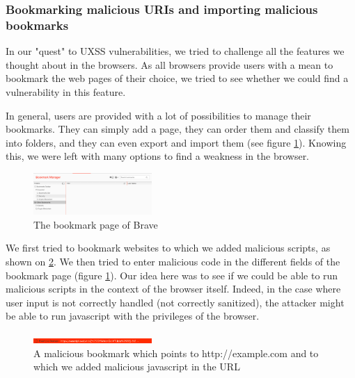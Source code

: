 \documentclass[journal]{IEEEtran}
\begin{document}
\subsubsection*{Bookmarking malicious URIs and importing malicious bookmarks}

In our "quest" to UXSS vulnerabilities, we tried to challenge all the features we thought about in the browsers. As all browsers provide users with a mean to bookmark the web pages of their choice, we tried to see whether we could find a vulnerability in this feature.

\medskip

In general, users are provided with a lot of possibilities to manage their bookmarks. They can simply add a page, they can order them and classify them into folders, and they can even export and import them (see figure \ref{fig:bookmarkPage}). Knowing this, we were left with many options to find a weakness in the browser. \\

\begin{figure}[h]
\centering
\includegraphics[width=0.4\textwidth]{images/bookmarkPage.png}
\caption{The bookmark page of Brave}
\label{fig:bookmarkPage}
\end{figure}


We first tried to bookmark websites to which we added malicious scripts, as shown on \ref{fig:maliciousBookmark}. We then tried to enter malicious code in the different fields of the bookmark page (figure \ref{fig:bookmarkPage}). Our idea here was to see if we could be able to run malicious scripts in the context of the browser itself. Indeed, in the case where user input is not correctly handled (not correctly sanitized), the attacker might be able to run javascript with the privileges of the browser.

\medskip

\begin{figure}[h]
\centering
\includegraphics[width=0.4\textwidth]{images/maliciousBookmark.png}
\caption{A malicious bookmark which points to http://example.com and to which we added malicious javascript in the URL}
\label{fig:maliciousBookmark}
\end{figure}
\end{document}
